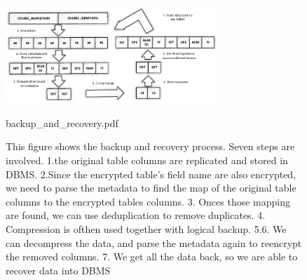 
\begin{figure}[tb]
\centering
\includegraphics[width=8cm]{images/backup_and_recovery.pdf}
\caption{backup\_and\_recovery.pdf}
\label{fig:stack7}
\caption{This figure shows the backup and recovery process. Seven steps are involved. 1.the original table columns are replicated and stored in DBMS. 2.Since the encrypted table's field name are also encrypted, we need to parse the metadata to find the map of the original table columns to the encrypted tables columns. 3. Onces those mapping are found, we can use deduplication to remove duplicates. 4. Compression is ofthen used together with logical backup. 5.6. We can decompress the data, and parse the metadata again to reencrypt the removed columns. 7. We get all the data back, so we are able to recover data into DBMS}
\end{figure}



